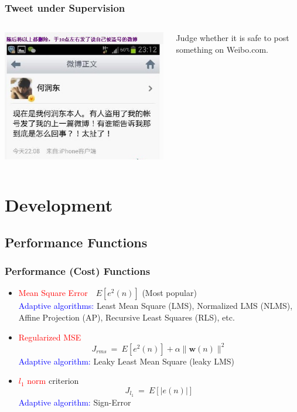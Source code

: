 \documentclass[12pt,hyperref=true,mathserif]{beamer}
\begin{document}
\begin{frame}
\frametitle{Tweet under Supervision}
\begin{columns}
\begin{column}{0.5\textwidth}
\includegraphics[scale=0.45]{HeRundong.jpg}
\end{column}
\begin{column}{0.5\textwidth}
Judge whether it is safe to post something on Weibo.com.
\end{column}
\end{columns}
\end{frame}

\section{Development}
\subsection{Performance Functions}
\begin{frame}
\frametitle{Performance (Cost) Functions}
\begin{itemize}
  \item \textcolor{red}{Mean Square Error}~~$E[e^{2}(n)]$ (Most popular)\\
  \textcolor{blue}{Adaptive algorithms:} Least Mean Square (LMS), Normalized LMS (NLMS),
  Affine Projection (AP), Recursive Least Squares (RLS), etc.

  \item \textcolor{red}{Regularized MSE}
  \begin{equation}\label{equ:RegMSE}
    J_{rms}~=~E[e^{2}(n)]+\alpha \|\mathbf{w}(n)\|^{2}
  \end{equation}
  \textcolor{blue}{Adaptive algorithm:} Leaky Least Mean Square (leaky LMS)
  \item \textcolor{red}{$l_{1}$ norm} criterion
    \begin{equation}\label{equ:Lnorm}
    J_{l_{1}}~=~E[|e(n)|]
  \end{equation}
  \textcolor{blue}{Adaptive algorithm:} Sign-Error
\end{itemize}
\end{frame}
\end{document}
